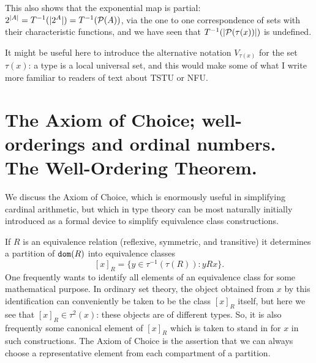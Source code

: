 \documentclass[12pt]{article}
\begin{document}
This also shows that the exponential map is partial:  $2^{|A| }= T^{-1}(|2^A|) = T^{-1}({\cal P}(A))$, via the one to one correspondence of sets with their characteristic functions,
and we have seen that $T^{-1}(|{\cal P}(\tau(x))|)$ is undefined.

It might be useful here to introduce the alternative notation $V_{\tau(x)}$ for the set $\tau(x)$:  a type is a local universal set, and this would make some of what I write more familiar to readers of text about TSTU or NFU.

\newpage

\section{The Axiom of Choice;  well-orderings and ordinal numbers.  The Well-Ordering Theorem.}

We discuss the Axiom of Choice, which is enormously useful in simplifying cardinal arithmetic, but which in type theory can be most naturally initially introduced as a formal device to simplify equivalence class constructions.

If $R$ is an equivalence relation (reflexive, symmetric, and transitive) it determines a partition of ${\tt dom}(R)$ into equivalence classes $$[x]_R = \{y \in \tau^{-1}(\tau(R)):yRx\}.$$
One frequently wants to identify all elements of an equivalence class for some mathematical purpose.  In ordinary set theory, the object obtained from $x$ by this identification
can conveniently be taken to be the class $[x]_R$ itself, but here we see that $[x]_R \in \tau^2(x)$:  these objects are of different types.  So, it is also frequently some canonical element of $[x]_R$ which is taken to stand in for $x$ in such constructions.  The Axiom of Choice is the assertion that we can always choose a representative element from each compartment of a partition.

 
\end{document}
